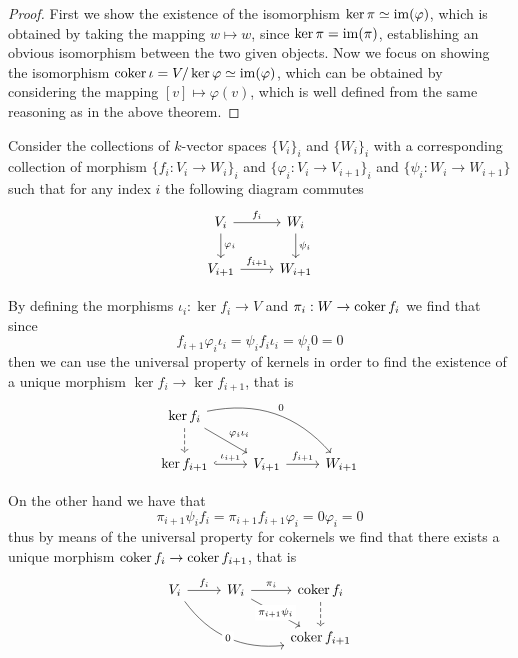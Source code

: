 \begin{proof}
    First we show the existence of the isomorphism \(\ker \pi \simeq \operatorname{im}(\varphi)\),
    which is obtained by taking the mapping \(w \mapsto w\), since \(\ker \pi =
    \operatorname{im}(\pi)\), establishing an obvious isomorphism between the two given objects.
    Now we focus on showing the isomorphism \(\operatorname{coker} \iota = V/\ker \varphi \simeq
    \operatorname{im}(\varphi)\), which can be obtained by considering the mapping \([v] \mapsto
    \varphi(v)\), which is well defined from the same reasoning as in the above
    theorem.
\end{proof}

Consider the collections of \(k\)-vector spaces \(\{V_i\}_i\) and \(\{W_i\}_i\)
with a corresponding collection of morphism \(\{f_i : V_i \to W_i\}_i\) and
\(\{\varphi_i : V_i \to V_{i+1}\}_i\) and \(\{\psi_i : W_i \to W_{i+1}\}\) such
that for any index \(i\) the following diagram commutes
\[
    \begin{tikzcd}
        V_i \rar["f_i"] \dar["\varphi_i"] &W_i \dar["\psi_i"]
        \\
        V_{i+1} \rar["f_{i+1}"] &W_{i+1}
    \end{tikzcd}
\]

By defining the morphisms \(\iota_i : \ker f_i \to V\) and \(\pi_i : W \to
\operatorname{coker} f_i\) we find that since
\[
    f_{i+1}  \varphi_i  \iota_i
    = \psi_i  f_i  \iota_i
    = \psi_i  0 = 0
\]
then we can use the universal property of kernels in order to find the existence
of a unique morphism \(\ker f_i \to \ker f_{i+1}\), that is
\[
    \begin{tikzcd}
        \ker f_i \dar[dashed] \ar[dr, "\varphi_i  \iota_i"] \ar[drr, bend
            left, "0"] & &
        \\
        \ker f_{i+1} \rar[hook, "\iota_{i+1}"] &V_{i+1} \rar["f_{i+1}"] &W_{i+1}
    \end{tikzcd}
\]

On the other hand we have that
\[
    \pi_{i+1}  \psi_i  f_i
    = \pi_{i+1}  f_{i+1}  \varphi_i
    = 0  \varphi_i = 0
\]
thus by means of the universal property for cokernels we find that there exists
a unique morphism \(\operatorname{coker} f_i \to \operatorname{coker} f_{i+1}\), that is
\[
    \begin{tikzcd}
        V_i \rar["f_i"] \ar[drr, bend right, "0" description]
        &W_i \rar["\pi_i"] \ar[dr, "\pi_{i+1}  \psi_i" description]
        &\coker f_i \dar[dashed]
        \\
        & &\coker f_{i+1}
    \end{tikzcd}
\]

